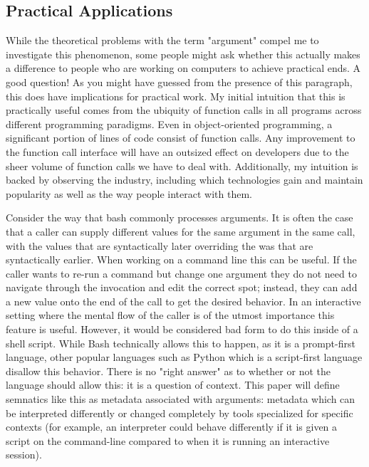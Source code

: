 \subsection{Practical Applications}
While the theoretical problems with the term "argument" compel me to investigate this
phenomenon, some people might ask whether this actually makes a difference to people who
are working on computers to achieve practical ends.
A good question!
As you might have guessed from the presence of this paragraph, this does have implications
for practical work.
My initial intuition that this is practically useful comes from the ubiquity of function
calls in all programs across different programming paradigms.
Even in object-oriented programming, a significant portion of lines of code consist of
function calls.
Any improvement to the function call interface will have an outsized effect on developers
due to the sheer volume of function calls we have to deal with.
Additionally, my intuition is backed by observing the industry, including which
technologies gain and maintain popularity as well as the way people interact with them.

Consider the way that bash commonly processes arguments.
It is often the case that a caller can supply different values for the same argument in
the same call, with the values that are syntactically later overriding the was that are
syntactically earlier.
When working on a command line this can be useful.
If the caller wants to re-run a command but change one argument they do not need to
navigate through the invocation and edit the correct spot; instead, they can add a new
value onto the end of the call to get the desired behavior.
In an interactive setting where the mental flow of the caller is of the utmost importance
this feature is useful.
However, it would be considered bad form to do this inside of a shell script.
While Bash technically allows this to happen, as it is a prompt-first language, other
popular languages such as Python which is a script-first language disallow this behavior.
There is no "right answer" as to whether or not the language should allow this: it is a
question of context.
This paper will define semnatics like this as metadata associated with arguments: metadata
which can be interpreted differently or changed completely by tools specialized for
specific contexts (for example, an interpreter could behave differently if it is given a
script on the command-line compared to when it is running an interactive session).

